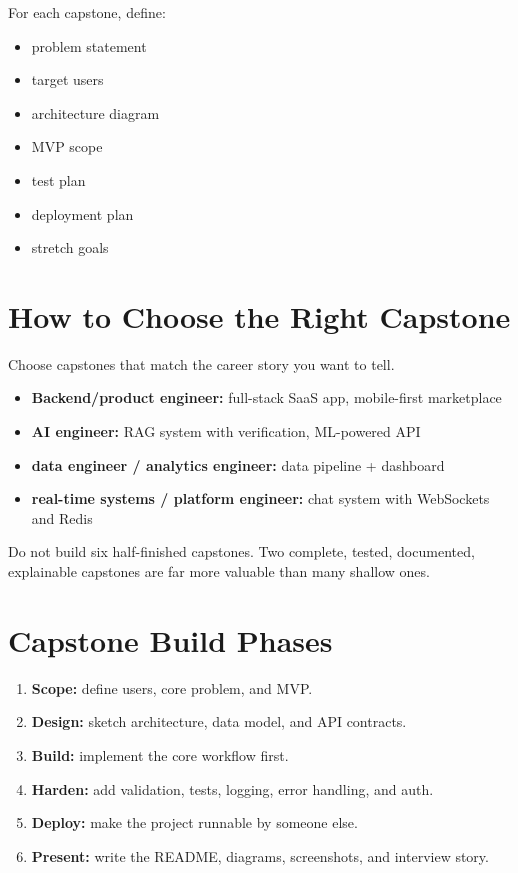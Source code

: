 \documentclass[12pt, a4paper, oneside]{book}
\begin{document}
\begin{projectbox}
For each capstone, define:
\begin{itemize}[leftmargin=2em]
    \item problem statement
    \item target users
    \item architecture diagram
    \item MVP scope
    \item test plan
    \item deployment plan
    \item stretch goals
\end{itemize}
\end{projectbox}

\section{How to Choose the Right Capstone}

Choose capstones that match the career story you want to tell.

\begin{itemize}[leftmargin=2em]
    \item \textbf{Backend/product engineer:} full-stack SaaS app, mobile-first marketplace
    \item \textbf{AI engineer:} RAG system with verification, ML-powered API
    \item \textbf{data engineer / analytics engineer:} data pipeline + dashboard
    \item \textbf{real-time systems / platform engineer:} chat system with WebSockets and Redis
\end{itemize}

\begin{warningbox}
Do not build six half-finished capstones. Two complete, tested, documented, explainable capstones are far more valuable than many shallow ones.
\end{warningbox}

\section{Capstone Build Phases}

\begin{enumerate}[leftmargin=2em]
    \item \textbf{Scope:} define users, core problem, and MVP.
    \item \textbf{Design:} sketch architecture, data model, and API contracts.
    \item \textbf{Build:} implement the core workflow first.
    \item \textbf{Harden:} add validation, tests, logging, error handling, and auth.
    \item \textbf{Deploy:} make the project runnable by someone else.
    \item \textbf{Present:} write the README, diagrams, screenshots, and interview story.
\end{enumerate}
\end{document}

